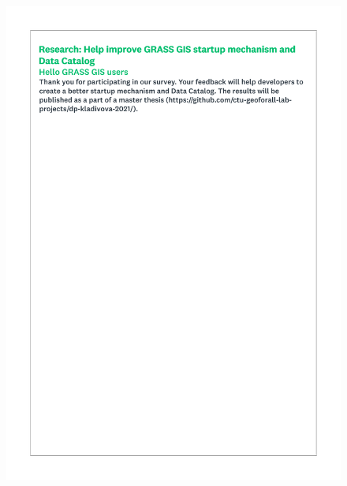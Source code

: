 \documentclass[a4paper,10pt,twoside]{article}
\begin{document}
 \begin{figure}[hbt!]
 \begin{center}
 \includegraphics[width=12.5cm]{../surveys/questionnaires/survey1_part1_page1_intro.pdf}
 \end{center}
 \end{figure}
 
\end{document}
